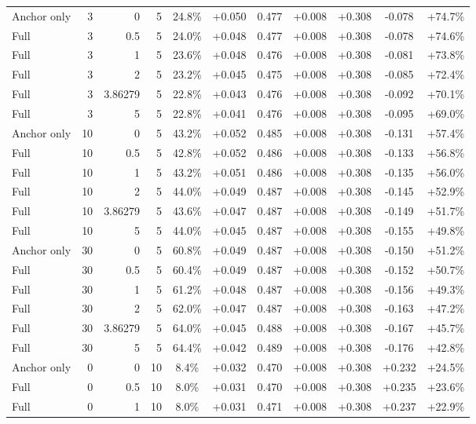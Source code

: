 \begin{table}[htbp]
\begin{tabular}{lrrrccccccc}
Anchor only & 3 & 0 & 5 & 24.8\% & +0.050 & 0.477 & +0.008 & +0.308 & -0.078 & +74.7\% \\
Full & 3 & 0.5 & 5 & 24.0\% & +0.048 & 0.477 & +0.008 & +0.308 & -0.078 & +74.6\% \\
Full & 3 & 1 & 5 & 23.6\% & +0.048 & 0.476 & +0.008 & +0.308 & -0.081 & +73.8\% \\
Full & 3 & 2 & 5 & 23.2\% & +0.045 & 0.475 & +0.008 & +0.308 & -0.085 & +72.4\% \\
Full & 3 & 3.86279 & 5 & 22.8\% & +0.043 & 0.476 & +0.008 & +0.308 & -0.092 & +70.1\% \\
Full & 3 & 5 & 5 & 22.8\% & +0.041 & 0.476 & +0.008 & +0.308 & -0.095 & +69.0\% \\
Anchor only & 10 & 0 & 5 & 43.2\% & +0.052 & 0.485 & +0.008 & +0.308 & -0.131 & +57.4\% \\
Full & 10 & 0.5 & 5 & 42.8\% & +0.052 & 0.486 & +0.008 & +0.308 & -0.133 & +56.8\% \\
Full & 10 & 1 & 5 & 43.2\% & +0.051 & 0.486 & +0.008 & +0.308 & -0.135 & +56.0\% \\
Full & 10 & 2 & 5 & 44.0\% & +0.049 & 0.487 & +0.008 & +0.308 & -0.145 & +52.9\% \\
Full & 10 & 3.86279 & 5 & 43.6\% & +0.047 & 0.487 & +0.008 & +0.308 & -0.149 & +51.7\% \\
Full & 10 & 5 & 5 & 44.0\% & +0.045 & 0.487 & +0.008 & +0.308 & -0.155 & +49.8\% \\
Anchor only & 30 & 0 & 5 & 60.8\% & +0.049 & 0.487 & +0.008 & +0.308 & -0.150 & +51.2\% \\
Full & 30 & 0.5 & 5 & 60.4\% & +0.049 & 0.487 & +0.008 & +0.308 & -0.152 & +50.7\% \\
Full & 30 & 1 & 5 & 61.2\% & +0.048 & 0.487 & +0.008 & +0.308 & -0.156 & +49.3\% \\
Full & 30 & 2 & 5 & 62.0\% & +0.047 & 0.487 & +0.008 & +0.308 & -0.163 & +47.2\% \\
Full & 30 & 3.86279 & 5 & 64.0\% & +0.045 & 0.488 & +0.008 & +0.308 & -0.167 & +45.7\% \\
Full & 30 & 5 & 5 & 64.4\% & +0.042 & 0.489 & +0.008 & +0.308 & -0.176 & +42.8\% \\
Anchor only & 0 & 0 & 10 & 8.4\% & +0.032 & 0.470 & +0.008 & +0.308 & +0.232 & +24.5\% \\
Full & 0 & 0.5 & 10 & 8.0\% & +0.031 & 0.470 & +0.008 & +0.308 & +0.235 & +23.6\% \\
Full & 0 & 1 & 10 & 8.0\% & +0.031 & 0.471 & +0.008 & +0.308 & +0.237 & +22.9\% \\

\end{tabular}
\end{table}
